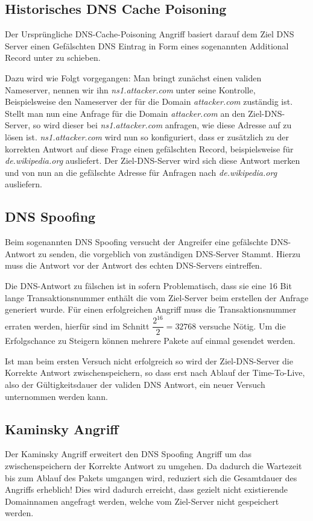 \documentclass[10pt,a4paper]{article}
\begin{document}
\subsection{Historisches DNS Cache Poisoning}
Der Ursprüngliche DNS-Cache-Poisoning Angriff basiert darauf dem Ziel DNS Server einen Gefälschten DNS Eintrag in Form eines sogenannten Additional Record unter zu schieben.

Dazu wird wie Folgt vorgegangen: Man bringt zunächst einen validen Nameserver, nennen wir ihn \emph{ns1.attacker.com} unter seine Kontrolle, Beispielsweise den Nameserver der für die Domain \emph{attacker.com} zuständig ist. Stellt man nun eine Anfrage für die Domain \emph{attacker.com} an den Ziel-DNS-Server, so wird dieser bei \emph{ns1.attacker.com} anfragen, wie diese Adresse auf zu lösen ist. \emph{ns1.attacker.com} wird nun so konfiguriert, dass er zusätzlich zu der korrekten Antwort auf diese Frage einen gefälschten Record, beispielsweise für \emph{de.wikipedia.org} ausliefert. Der Ziel-DNS-Server wird sich diese Antwort merken und von nun an die gefälschte Adresse für Anfragen nach \emph{de.wikipedia.org} ausliefern.


\subsection{DNS Spoofing}
Beim sogenannten DNS Spoofing versucht der Angreifer eine gefälschte DNS-Antwort zu senden, die vorgeblich von zuständigen DNS-Server Stammt.  Hierzu muss die Antwort vor der Antwort des echten DNS-Servers eintreffen. 

Die DNS-Antwort zu fälschen ist in sofern Problematisch, dass sie eine 16 Bit lange Transaktionsnummer enthält die vom Ziel-Server beim erstellen der Anfrage generiert wurde. Für einen erfolgreichen Angriff muss die Transaktionsnummer erraten werden, hierfür sind im Schnitt $\dfrac{2^{16}}{2}=32768$ versuche Nötig.
Um die Erfolgschance zu Steigern können mehrere Pakete auf einmal gesendet werden.

Ist man beim ersten Versuch nicht erfolgreich so wird der Ziel-DNS-Server die Korrekte Antwort zwischenspeichern, so dass erst nach Ablauf der Time-To-Live, also der Gültigkeitsdauer der validen DNS Antwort, ein neuer Versuch unternommen werden kann.

\subsection{Kaminsky Angriff}
Der Kaminsky Angriff erweitert den DNS Spoofing Angriff um das  zwischenspeichern der Korrekte Antwort zu umgehen. Da dadurch die Wartezeit bis zum Ablauf des Pakets umgangen wird, reduziert sich die Gesamtdauer des Angriffs erheblich! Dies wird dadurch erreicht, dass gezielt nicht existierende Domainnamen angefragt werden, welche vom Ziel-Server nicht gespeichert werden.
\end{document}
